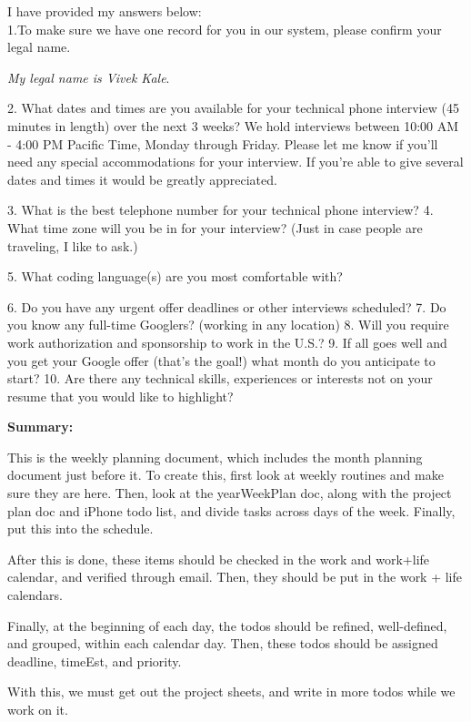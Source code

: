 \documentclass[11pt]{article}
\begin{document}
\maketitle  

I have provided my answers below: \\ 

1.To make sure we have one record for you in our system, please
confirm your legal name.

\textit{My legal name is Vivek Kale}. 

2. What dates and times are you available for your technical phone
interview (45 minutes in length) over the next 3 weeks? We hold
interviews between 10:00 AM - 4:00 PM Pacific Time, Monday through
Friday. Please let me know if you'll need any special accommodations
for your interview. If you're able to give several dates and times it
would be greatly appreciated.

 3. What is the best telephone number for your technical phone
 interview? 4. What time zone will you be in for your interview? (Just
 in case people are traveling, I like to ask.)

 5. What coding language(s) are you most comfortable with?

6. Do you have any urgent offer deadlines or other interviews
scheduled? 7. Do you know any full-time Googlers? (working in any
location) 8. Will you require work authorization and sponsorship to
work in the U.S.? 9. If all goes well and you get your Google offer
(that’s the goal!) what month do you anticipate to start? 10. Are
there any technical skills, experiences or interests not on your
resume that you would like to highlight? 





\textbf{Summary:} {\small This is the weekly planning document, which includes 
the month planning document just before it. 
To create this, first look at weekly routines and make sure they are here. Then,
look at the yearWeekPlan doc, along with the project plan doc and iPhone
todo list, and divide tasks across days of the week. Finally, put this
into the schedule. 

After this is done, these items should be checked in the work and
work+life calendar, and verified through email. 
Then, they should be put in the work + life
calendars.

Finally, at the beginning of each day, the todos should be refined,
well-defined, and grouped, within each calendar day. Then, these todos
should be assigned deadline, timeEst, and priority. 

With this, we must get out the project sheets, and write in more todos
while we work on it. 
}\\ 
\end{document}
